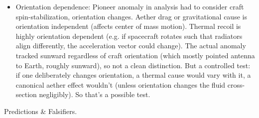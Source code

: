 \documentclass[11pt]{article}
\begin{document}
\begin{itemize}
\item 
Orientation dependence: Pioneer anomaly in analysis had to consider craft spin-stabilization, orientation changes. Aether drag or gravitational cause is orientation independent (affects center of mass motion). Thermal recoil is highly orientation dependent (e.g. if spacecraft rotates such that radiators align differently, the acceleration vector could change). The actual anomaly tracked sunward regardless of craft orientation (which mostly pointed antenna to Earth, roughly sunward), so not a clean distinction. But a controlled test: if one deliberately changes orientation, a thermal cause would vary with it, a canonical aether effect wouldn’t (unless orientation changes the fluid cross-section negligibly). So that’s a possible test.




\end{itemize}

Predictions & Falsifiers.
\end{document}

